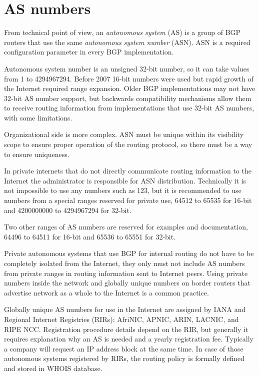 \section{AS numbers}

From technical point of view, an \emph{autonomous system} (AS) is a group of BGP routers that use the same
\emph{autonomous system number} (ASN). ASN is a required configuration parameter in every BGP implementation.

Autonomous system number is an unsigned 32-bit number, so it can take values from 1 to 4294967294.
Before 2007 16-bit numbers were used but rapid growth of the Internet required range expansion\cite{rfc6793}.
Older BGP implementations may not have 32-bit AS number support, but backwards compatibility mechanisms allow
them to receive routing information from implementations that use 32-bit AS numbers, with some limitations.

Organizational side is more complex. ASN must be unique within its visibility scope to ensure proper
operation of the routing protocol, so there must be a way to ensure uniqueness.

In private internets that do not directly communicate routing information to the Internet the administrator is
responsible for ASN distribution. Technically it is not impossible to use any numbers such as 123,
but it is recommended to use numbers from a special ranges reserved for private use, 64512 to 65535 for
16-bit\cite{rfc1930} and 4200000000 to 4294967294 for 32-bit\cite{rfc6996}.

Two other ranges of AS numbers are reserved for examples and documentation, 64496 to 64511 for 16-bit and
65536 to 65551 for 32-bit\cite{rfc5398}.

Private autonomous systems that use BGP for internal routing do not have to be completely isolated from the Internet,
they only must not include AS numbers from private ranges in routing information sent to Internet peers. Using private
numbers inside the network and globally unique numbers on border routers that advertise network as a whole to the Internet
is a common practice.

Globally unique AS numbers for use in the Internet are assigned by IANA and Regional Internet Registries (RIRs): AfriNIC, APNIC,
ARIN, LACNIC, and RIPE NCC. Registration procedure details depend on the RIR, but generally it requires explanation why
an AS is needed and a yearly registration fee. Typically a company will request an IP address block at the same time.
In case of those autonomous systems registered by RIRs, the routing policy is formally defined and stored in WHOIS database.

